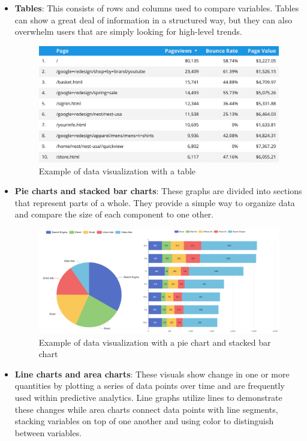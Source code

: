 \documentclass[MSE,Master,english]{twbook}%
\begin{document}
\begin{itemize}
  \item \textbf{Tables}: This consists of rows and columns used to compare variables. Tables can show a great deal of information in a structured way, but they can also overwhelm users that are simply looking for high-level trends.
  \begin{figure}[H]
    \centering
    \includegraphics[width=\textwidth]{examples/table.png}
    \caption{Example of data visualization with a table}
    \label{fig:table_example}
  \end{figure}
  \item \textbf{Pie charts and stacked bar charts}: These graphs are divided into sections that represent parts of a whole. They provide a simple way to organize data and compare the size of each component to one other.
  \begin{figure}[H]
    \centering
    \includegraphics[width=\textwidth]{examples/pie_bar.png}
    \caption{Example of data visualization with a pie chart and stacked bar chart}
    \label{fig:pie_bar_example}
  \end{figure}
  \item \textbf{Line charts and area charts}: These visuals show change in one or more quantities by plotting a series of data points over time and are frequently used within predictive analytics. Line graphs utilize lines to demonstrate these changes while area charts connect data points with line segments, stacking variables on top of one another and using color to distinguish between variables.

\end{itemize}
\end{document}
